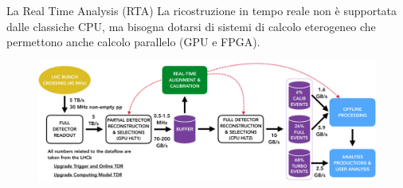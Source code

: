 \documentclass[
10pt,
aspectratio=169,
]{beamer}
\begin{document}
\begin{frame}{La Real Time Analysis (RTA)}
La ricostruzione in tempo reale non è supportata dalle classiche CPU, ma bisogna dotarsi di sistemi di calcolo eterogeneo che permettono anche calcolo parallelo (GPU e FPGA).
\begin{figure}
    \centering
    \includegraphics[width=\textwidth]{figures/hidef_RTA_dataflow_widescreen.png}
\end{figure}
    
\end{frame}
\end{document}
